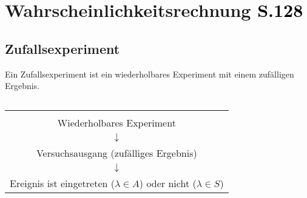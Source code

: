 % 
% 
% 
% 
%

\chapter{Wahrscheinlichkeitsrechnung \small{\textcolor{black}{S.128}}}
	\section{Zufallsexperiment}
		\vspace*{-0.8cm}\begin{minipage}{0.4\textwidth}
			Ein Zufallsexperiment ist ein wiederholbares Experiment mit einem zufälligen Ergebnis.
		\end{minipage}
		\begin{minipage}{0.05\textwidth}$ $\end{minipage}
		\begin{minipage}{0.55\textwidth}
			\begin{tabular}{|c|}
			\hline\\[-0.4cm]
				Wiederholbares Experiment\\
				$\downarrow$\\
				Versuchsausgang (zufälliges Ergebnis)\\
				$\downarrow$\\
				Ereignis ist eingetreten ($\lambda \in A$) oder nicht ($\lambda\in S$)\\[0.2cm]
			\hline
			\end{tabular}
		\end{minipage}\\[-0.6cm]
	
